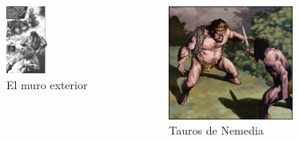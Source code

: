 \begin{frame}{}
\begin{columns}
    \begin{figure}[htb]
    \centering
        \includegraphics[width=0.5\textwidth]{img/res/07}
        \caption{El muro exterior}
    \end{figure}    
    \begin{figure}[htb]
    \centering
        \includegraphics[width=0.7\textwidth]{img/res/08}
        \caption{Tauros de Nemedia}
    \end{figure}    
\end{columns}
\end{frame}

